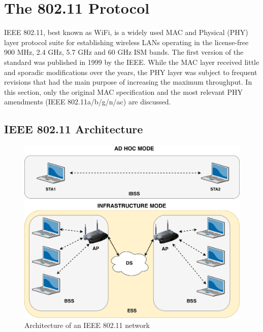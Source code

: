 \section{The 802.11 Protocol}


\gls{IEEE} 802.11, best known as WiFi, is a widely used MAC and Physical (PHY) layer protocol suite for establishing wireless \glspl{LAN} operating in the license-free 900 MHz, 2.4 GHz, 5.7 GHz and 60 GHz \gls{ISM} bands. The first version of the standard was published in 1999 by the \gls{IEEE}. While the MAC layer received little and sporadic modifications over the years, the PHY layer was subject to frequent revisions that had the main purpose of increasing the maximum throughput. In this section, only the original MAC specification and the most relevant PHY amendments (IEEE 802.11a/b/g/n/ac) are discussed.

\subsection{IEEE 802.11 Architecture}

\begin{figure}[h]
    \centering
    \includegraphics[width=1\textwidth]{images/wifi-architecture.pdf}
    \caption{Architecture of an IEEE 802.11 network}
    \label{fig:wifi-architecture}
\end{figure}

